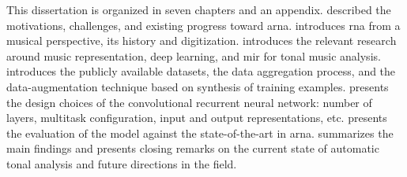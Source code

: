 
This dissertation is organized in seven chapters and an
appendix.  described the motivations,
challenges, and existing progress toward \gls{arna}.
 introduces
\gls{rna} from a musical perspective, its history and
digitization.  introduces the relevant
research around music representation, deep learning, and
\gls{mir} for tonal music analysis.
 introduces the
publicly available datasets, the data aggregation process,
and the data-augmentation technique based on synthesis of
training examples.  presents the design
choices of the convolutional recurrent neural network:
number of layers, multitask configuration, input and output
representations, etc. 
presents the evaluation of the model against the
state-of-the-art in \gls{arna}. 
summarizes the main findings and presents closing remarks on
the current state of automatic tonal analysis and future
directions in the field.
